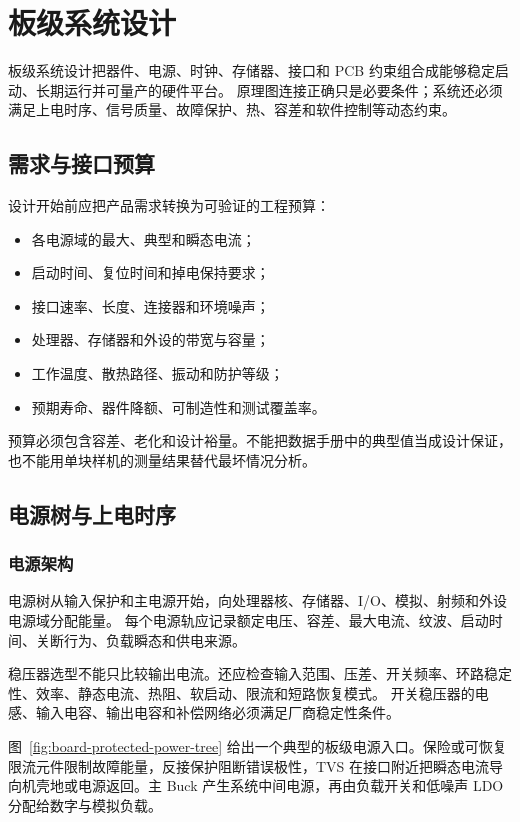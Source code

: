\chapter{板级系统设计}
\label{chap:board-system-design}

板级系统设计把器件、电源、时钟、存储器、接口和 PCB 约束组合成能够稳定启动、长期运行并可量产的硬件平台。
原理图连接正确只是必要条件；系统还必须满足上电时序、信号质量、故障保护、热、容差和软件控制等动态约束。

\section{需求与接口预算}

设计开始前应把产品需求转换为可验证的工程预算：
\begin{itemize}
  \item 各电源域的最大、典型和瞬态电流；
  \item 启动时间、复位时间和掉电保持要求；
  \item 接口速率、长度、连接器和环境噪声；
  \item 处理器、存储器和外设的带宽与容量；
  \item 工作温度、散热路径、振动和防护等级；
  \item 预期寿命、器件降额、可制造性和测试覆盖率。
\end{itemize}

预算必须包含容差、老化和设计裕量。不能把数据手册中的典型值当成设计保证，也不能用单块样机的测量结果替代最坏情况分析。

\section{电源树与上电时序}

\subsection{电源架构}

电源树从输入保护和主电源开始，向处理器核、存储器、I/O、模拟、射频和外设电源域分配能量。
每个电源轨应记录额定电压、容差、最大电流、纹波、启动时间、关断行为、负载瞬态和供电来源。

稳压器选型不能只比较输出电流。还应检查输入范围、压差、开关频率、环路稳定性、效率、静态电流、热阻、软启动、限流和短路恢复模式。
开关稳压器的电感、输入电容、输出电容和补偿网络必须满足厂商稳定性条件。

图~\ref{fig:board-protected-power-tree} 给出一个典型的板级电源入口。保险或可恢复限流元件限制故障能量，反接保护阻断错误极性，TVS 在接口附近把瞬态电流导向机壳地或电源返回。主 Buck 产生系统中间电源，再由负载开关和低噪声 LDO 分配给数字与模拟负载。

